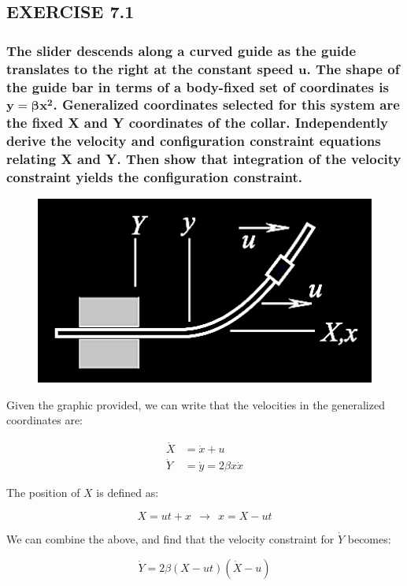 \documentclass[12pt, letterpaper]{../assignment}
\begin{document}
\subsection*{EXERCISE 7.1}
\subsubsection*{The slider descends along a curved guide as
the guide translates to the right at the constant speed $\bm{u}$.
The shape of the guide bar in terms of a body-fixed set of coordinates is $\bm{y = \beta x^2}$.
Generalized coordinates selected for this system are the fixed X and Y coordinates of the collar.
Independently derive the velocity and configuration constraint equations relating X and Y.
Then show that integration of the velocity constraint yields the configuration constraint.}

\begin{figure}[H]
    \centering
    \includegraphics[scale=0.9,frame]{images/Q7_1.png}
\end{figure}


Given the graphic provided, we can write that the velocities in the generalized coordinates are:

\begin{equation*}
\begin{aligned}
\dot{X} &= \dot{x} + u \\
\dot{Y} &= \dot{y} = 2 \beta x \dot{x}
\end{aligned}
\end{equation*}

The position of $X$ is defined as:

$$ X = ut + x \ \ \rightarrow \ \ x = X - ut $$

We can combine the above, and find that the velocity constraint for $\dot{Y}$ becomes:

$$ \dot{Y}  = 2 \beta \left( X - ut \right) \left( \dot{X} - u \right)  $$
\end{document}

